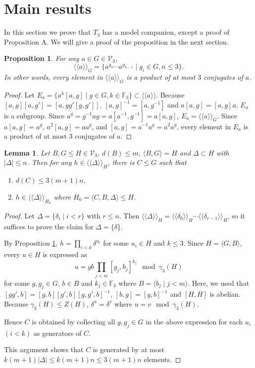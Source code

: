 \documentclass[11pt,reqno]{article}
\newtheorem{lemma}[theorem]{Lemma}
\newtheorem{proposition}[theorem]{Proposition}
\theoremstyle{definition}
\theoremstyle{remark}
\newcommand{\llangle}{\langle\!\langle}
\newcommand{\rrangle}{\rangle\!\rangle}
\begin{document}
\section{Main results}
\label{sec:main-results}
In this section we prove that $T_3$ has a model companion, except a proof of Proposition A.
We will give a proof of the proposition in the next section.


\begin{proposition}\label{proposition:bounded number of conjugates}
    For any $a\in G\in \mathcal V_3$,
    \[
    \llangle a\rrangle_G = \{a^{g_0}\cdots a^{g_{n-1}}\mid g_i\in G, n\leq 3\}.    
    \]
    In other words, every element in $\llangle a\rrangle_G$ is a product of at most $3$ conjugates of $a$. 
\end{proposition}
\begin{proof}
Let $E_a=\{a^k[a,g]\mid g\in G, k\in\mathbb F_3\}\subset \llangle a\rrangle$.
Because $[a,g][a,g']=[a,gg'[g,g']]$, $[a,g]^{-1}=[a,g^{-1}]$ and $a[a,g]=[a,g]a$, $E_a$ is a subgroup.
Since $a^g=g^{-1}ag=a[a^{-1},g^{-1}]=a[a,g]$, $E_a=\llangle a\rrangle_G$.
Since $a[a,g]=a^g$, $a^2[a,g]=aa^g$, and $[a,g]=a^{-1}a^g=a^2a^g$, every element in $E_a$ is a product of at most $3$ conjugates of $a$.
\end{proof}


\begin{lemma}\label{lemma:witness in bdd support}
    Let $B,G\leq H\in \mathcal V_3$, $d(B)\leq m$, $\langle B,G\rangle = H$ and $\Delta\subset H$ with $|\Delta|\leq n$.
    Then for any $h\in \llangle \Delta \rrangle_H$,
    there is $C\leq G$ such that
    \begin{enumerate}
        \item $d(C)\leq 3(m+1)n$,
        \item $h\in \llangle \Delta \rrangle_{H_0}$ where $H_0=\langle C,B,\Delta\rangle\leq H$.
    \end{enumerate}
    
\end{lemma}
\begin{proof}
Let $\Delta=\{\delta_i\mid i<r\}$ with $r\leq n$. Then $\llangle \Delta \rrangle_H=\llangle \delta_0\rrangle_H\cdots\llangle\delta_{r-1}\rrangle_H$, so it suffices to prove the claim for $\Delta=\{\delta\}$.

By Proposition \ref{proposition:bounded number of conjugates}, $h=\prod_{i<k}\delta^{u_i}$ for some $u_i\in H$ and $k\leq 3$.
Since $H=\langle G,B\rangle$, every $u\in H$ is expressed as
\[
    u = gb\prod_{j<m}[g_j,b_j]^{k_j} \mod \gamma_3(H)
    \]
for some $g,g_j\in G$, $b\in B$ and $k_j\in \mathbb F_3$ where $B=\langle b_j\mid j<m\rangle$.
Here, we used that $[gg',b]=[g,b][g',b][g,g',b]^{-1}$, $[b,g]=[g,b]^{-1}$ and $[H,H]$ is abelian.
Because $\gamma_3(H)\leq Z(H)$, $\delta^u=\delta^v$ where $u=v \mod\gamma_3(H)$.

Hence $C$ is obtained by collecting all $g,g_j\in G$ in the above expression for each $u_i$ $(i<k)$ as generators of $C$.

This argument shows that $C$ is generated by at most $k(m+1)|\Delta|\leq k(m+1)n\leq 3(m+1)n$ elements.
\end{proof}
\end{document}
